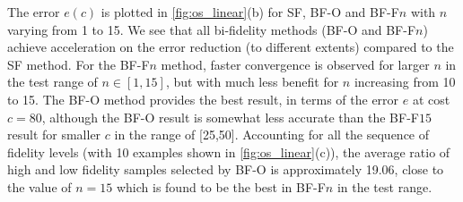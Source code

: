 \documentclass[11pt]{article}
\begin{document}
The error $e(c)$ is plotted in \ref{fig:os_linear}(b) for SF, BF-O and BF-F$n$ with $n$ varying from 1 to 15. We see that all bi-fidelity methods (BF-O and BF-F$n$) achieve acceleration on the error reduction (to different extents) compared to the SF method. For the BF-F$n$ method, faster convergence is observed for larger $n$ in the test range of $n\in[1, 15]$, but with much less benefit for $n$ increasing from 10 to 15. The BF-O method provides the best result, in terms of the error $e$ at cost $c=80$, although the BF-O result is somewhat less accurate than the BF-F$15$ result for smaller $c$ in the range of [25,50]. Accounting for all the sequence of fidelity levels (with 10 examples shown in \ref{fig:os_linear}(c)), the average ratio of high and low fidelity samples selected by BF-O is approximately 19.06, close to the value of $n=15$ which is found to be the best in BF-F$n$ in the test range.
\end{document}
